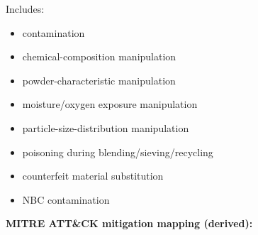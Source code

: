 \documentclass[10pt,a4paper,oneside]{report}
\begin{document}
Includes:

\begin{itemize}
\item contamination
\item chemical-composition manipulation
\item powder-characteristic manipulation
\item moisture/oxygen exposure manipulation
\item particle-size-distribution manipulation
\item poisoning during blending/sieving/recycling
\item counterfeit material substitution
\item NBC contamination
\end{itemize}

\textbf{MITRE ATT\&CK mitigation mapping (derived):}
\end{document}
